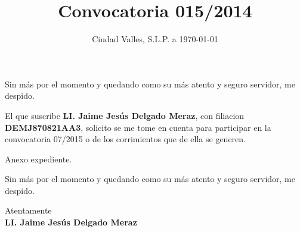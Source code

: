 \documentclass[10pt,letterpaper,sans]{moderncv}
\title{Convocatoria 015/2014}
\begin{document}
\date{Ciudad Valles, S.L.P. a \today}
\opening{}
\closing{Sin más por el momento y quedando como su más atento y seguro servidor, me despido.}
\makelettertitle

El que suscribe \textbf{LI. Jaime Jesús Delgado Meraz}, con filiacion \textbf{DEMJ870821AA3}, solicito se me tome en cuenta para participar en la convocatoria 07/2015 o de los corrimientos que de ella se generen.

Anexo expediente.

Sin más por el momento y quedando como su más atento y seguro servidor, me despido.

\vspace{0.5cm}Atentamente\vspace{1.5cm}\\\textbf{LI. Jaime Jesús Delgado Meraz}

\end{document}
